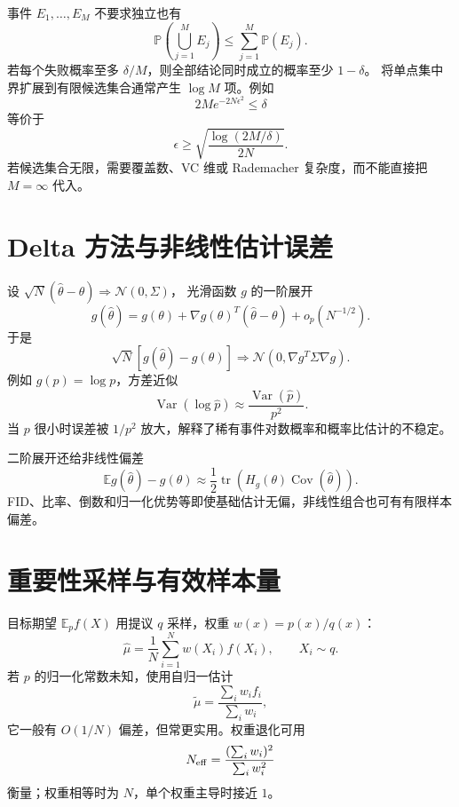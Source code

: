 \documentclass[11pt]{article}
\numberwithin{equation}{section}
\newcommand{\E}{\mathbb{E}}
\newcommand{\Pp}{\mathbb{P}}
\newcommand{\1}{\mathbf{1}}
\newcommand{\cN}{\mathcal{N}}
\newcommand{\tr}{\operatorname{tr}}
\newcommand{\Var}{\operatorname{Var}}
\newcommand{\Cov}{\operatorname{Cov}}
\begin{document}
事件 $E_1,…,E_M$ 不要求独立也有
\begin{equation}
 \Pp\left(\bigcup_{j=1}^{M}E_j\right)
 \le\sum_{j=1}^{M}\Pp(E_j).
\end{equation}
若每个失败概率至多 $\delta/M$，则全部结论同时成立的概率至少 $1-\delta$。
将单点集中界扩展到有限候选集合通常产生 $\log M$ 项。例如
\begin{equation}
 2M e^{-2N\epsilon^2}\le\delta
\end{equation}
等价于
\begin{equation}
 \epsilon\ge\sqrt{\frac{\log(2M/\delta)}{2N}}.
\end{equation}
若候选集合无限，需要覆盖数、VC 维或 Rademacher 复杂度，而不能直接把 $M=\infty$ 代入。

\section{Delta 方法与非线性估计误差}

设 $\sqrt N(\widehat\theta-\theta)\Rightarrow\cN(0,\Sigma)$，
光滑函数 $g$ 的一阶展开
\begin{equation}
 g(\widehat\theta)=g(\theta)+
 \nabla g(\theta)^T(\widehat\theta-\theta)+o_p(N^{-1/2}).
\end{equation}
于是
\begin{equation}
 \sqrt N[g(\widehat\theta)-g(\theta)]
 \Rightarrow\cN(0,\nabla g^T\Sigma\nabla g).
\end{equation}
例如 $g(p)=\log p$，方差近似
\begin{equation}
 \Var(\log\widehat p)\approx\frac{\Var(\widehat p)}{p^2}.
\end{equation}
当 $p$ 很小时误差被 $1/p^2$ 放大，解释了稀有事件对数概率和概率比估计的不稳定。

二阶展开还给非线性偏差
\begin{equation}
 \E g(\widehat\theta)-g(\theta)
 \approx\frac12\tr(H_g(\theta)\Cov(\widehat\theta)).
\end{equation}
FID、比率、倒数和归一化优势等即使基础估计无偏，非线性组合也可有有限样本偏差。

\section{重要性采样与有效样本量}

目标期望 $\E_p f(X)$ 用提议 $q$ 采样，权重
$w(x)=p(x)/q(x)$：
\begin{equation}
 \widehat\mu=\frac1N\sum_{i=1}^{N}w(X_i)f(X_i),
 \qquad X_i\sim q.
\end{equation}
若 $p$ 的归一化常数未知，使用自归一估计
\begin{equation}
 \widetilde\mu=\frac{\sum_iw_if_i}{\sum_iw_i},
\end{equation}
它一般有 $O(1/N)$ 偏差，但常更实用。权重退化可用
\begin{equation}
 N_{\rm eff}=\frac{(\sum_iw_i)^2}{\sum_iw_i^2}
\end{equation}
衡量；权重相等时为 $N$，单个权重主导时接近 $1$。
\end{document}

